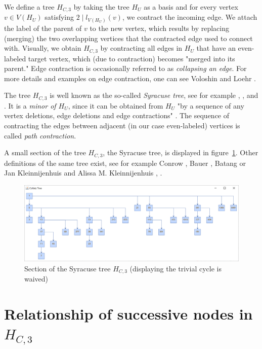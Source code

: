 We define a tree $H_{C,3}$ by taking the tree $H_U$ as a basis and for every vertex $v\in V(H_U)$ satisfying $2\mid l_{V(H_U)}(v)$, we contract the incoming edge. We attach the label of the parent of $v$ to the new vertex, which results by replacing (merging) the two overlapping vertices that the contracted edge used to connect with. Visually, we obtain $H_{C,3}$ by contracting all edges in $H_U$ that have an even-labeled target vertex, which (due to contraction) becomes "merged into its parent." Edge contraction is occasionally referred to as \textit{collapsing an edge}. For more details and examples on edge contraction, one can see Voloshin \cite[p.~27]{Ref_Voloshin} and Loehr \cite{Ref_Loehr}.

The tree $H_{C,3}$ is well known as the so-called \textit{Syracuse tree}, see for example \cite{Ref_Kleinnijenhuis_2020a}, \cite{Ref_Aberkane_2017}, and \cite{Ref_Aberkane_2020}. It is a \textit{minor of $H_U$}, since it can be obtained from $H_U$ "by a sequence of any vertex deletions, edge deletions and edge contractions" \cite[p.~32]{Ref_Voloshin}. The sequence of contracting the edges between adjacent (in our case even-labeled) vertices is called \textit{path contraction}.

A small section of the tree $H_{C,3}$, the Syracuse tree, is displayed in figure~\ref{fig:2}. Other definitions of the same tree exist, see for example Conrow \cite{Ref_Conrow}, Bauer \cite[p.~379]{Ref_Bauer}, Batang \cite{Ref_Batang} or Jan Kleinnijenhuis and Alissa M. Kleinnijenhuis \cite{Ref_Kleinnijenhuis_2020a}, \cite{Ref_Kleinnijenhuis_2020b}.

\begin{figure}
	\includegraphics[width=1.00\textwidth]{figures/h_c3.png}
	\caption{Section of the Syracuse tree $H_{C,3}$ (displaying the trivial cycle is waived)}
	\label{fig:2}
\end{figure}

\section{\texorpdfstring{Relationship of successive nodes in $H_{C,3}$}{Relationship of successive nodes in HC3}}

